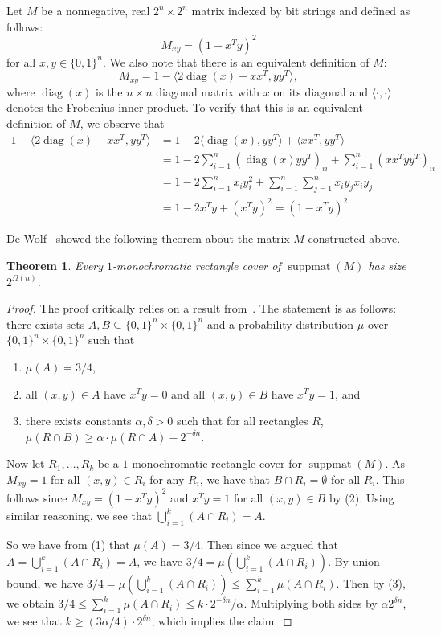 \documentclass{article}
\newtheorem{theorem}{\sc Theorem}
\theoremstyle{definition}
\theoremstyle{remark}
\newcommand{\diag}{\operatorname{diag}}
\newcommand{\bits}{\{0,1\}}
\newcommand{\suppmat}{\operatorname{suppmat}}
\begin{document}
Let $M$ be a nonnegative, real $2^n \times 2^n$ matrix indexed by bit strings and defined as follows:
\[
M_{xy} = {(1 - x^Ty)}^2
\]
for all $x,y \in \bits^n$. We also note that there is an equivalent definition of $M$:
\[
M_{xy} = 1 - \langle 2\diag(x) - xx^T, yy^T\rangle,
\]
where $\diag(x)$ is the $n \times n$ diagonal matrix with $x$ on its diagonal and $\langle\cdot, \cdot\rangle$ denotes the Frobenius inner product. To verify that this is an equivalent definition of $M$, we observe that
\begin{align*}
1 - \langle 2\diag(x) - xx^T, yy^T\rangle & = 1 - 2\langle\diag(x), yy^T\rangle + \langle xx^T, yy^T\rangle \\
& = 1 - 2 \sum_{i=1}^n (\diag(x)yy^T)_{ii} + \sum_{i=1}^n (xx^Tyy^T)_{ii}  \\
& = 1 - 2 \sum_{i=1}^n x_{i} y_{i}^2 + \sum_{i=1}^n \sum_{j=1}^n x_iy_jx_iy_j \\
& =  1 - 2 x^Ty + {(x^Ty)}^2 = {(1 - x^Ty)}^2
\end{align*}

De Wolf~\cite{de-wolf} showed the following theorem about the matrix $M$ constructed above.
\begin{theorem}\label{theor:dewolf}
Every $1$-monochromatic rectangle cover of $\suppmat(M)$ has size $2^{\Omega(n)}$.
\end{theorem}
\begin{proof}
The proof critically relies on a result from~\cite{cc-nisan}. The statement is as follows: there exists sets $A, B \subseteq \bits^n \times \bits^n$ and a probability distribution $\mu$ over $\bits^n \times \bits^n$ such that 
\begin{enumerate}\itemsep0pt
\item $\mu(A) = 3/4$,
\item all $(x,y) \in A$ have $x^Ty =0$ and all $(x,y) \in B$ have $x^Ty = 1$, and 
\item there exists constants $\alpha, \delta > 0$ such that for all rectangles $R$,  $\mu(R \cap B) \ge \alpha \cdot \mu(R \cap A) - 2^{-\delta n}$.
\end{enumerate}

Now let $R_1, \ldots, R_k$ be a $1$-monochromatic rectangle cover for $\suppmat(M)$. As $M_{xy} = 1$ for all $(x,y) \in R_i$ for any $R_i$, we have that $B \cap R_i = \emptyset$ for all $R_i$. This follows since $M_{xy} = (1 - x^Ty)^2$ and $x^Ty = 1$ for all $(x,y) \in B$ by (2). Using similar reasoning, we see that $\bigcup_{i=1}^k (A \cap R_i) = A$. 

So we have from (1) that $\mu(A) = 3/4$. Then since we argued that $A = \bigcup_{i=1}^k (A \cap R_i) = A$, we have $3/4 = \mu(\bigcup_{i=1}^k (A \cap R_i))$. By union bound, we have $3/4 = \mu(\bigcup_{i=1}^k (A \cap R_i)) \le \sum_{i=1}^k \mu(A \cap R_i)$. Then by (3), we obtain $3/4 \le \sum_{i=1}^k \mu(A \cap R_i) \le k\cdot 2^{-\delta n} /\alpha$. Multiplying both sides by $\alpha2^{\delta n}$, we see that $k \ge (3\alpha/4)\cdot2^{\delta n}$, which implies the claim.
\end{proof}
\end{document}
